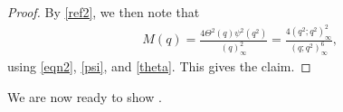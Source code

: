 \documentclass[12pt,reqno]{amsart}
\renewcommand{\(}{\left\(}
\renewcommand{\)}{\right\)}
\newcommand{\os}[2]{\overset{#1}{#2}}
\numberwithin{equation}{section}
\theoremstyle{plain}
\theoremstyle{definition}
\numberwithin{equation}{section}
\begin{document}
\begin{proof}
By \eqref{ref2}, we then note that
\begin{align*}
&M\!\left(q\right)=%
\frac{4\Theta^2\!\left(q\right)\psi^2\!\left(q^2\right)}{\left(q\right)^2_\infty}%
=\frac{4\left(q^2;q^2\right)^{2}_\infty}{\left(q;q^2\right)^6_\infty},%
\end{align*}
using \eqref{eqn2}, \eqref{psi}, and \eqref{theta}. This gives the claim.\qedhere 
\end{proof}

We are now ready to show .
\end{document}
